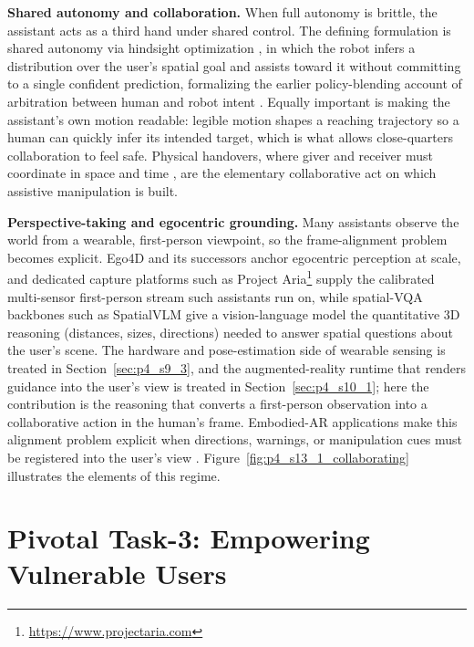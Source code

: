 \textbf{Shared autonomy and collaboration.} When full autonomy is brittle, the assistant acts as a third hand under shared control. 
The defining formulation is shared autonomy via hindsight optimization \cite{javdani2018shared}, in which the robot infers a distribution over the user's spatial goal and assists toward it without committing to a single confident prediction, formalizing the earlier policy-blending account of arbitration between human and robot intent \cite{dragan2013policy}. 
Equally important is making the assistant's own motion readable: legible motion \cite{dragan2013legibility} shapes a reaching trajectory so a human can quickly infer its intended target, which is what allows close-quarters collaboration to feel safe. Physical handovers, where giver and receiver must coordinate in space and time \cite{strabala2013handover}, are the elementary collaborative act on which assistive manipulation is built.

\textbf{Perspective-taking and egocentric grounding.} Many assistants observe the world from a wearable, first-person viewpoint, so the frame-alignment problem becomes explicit. 
Ego4D \cite{grauman2022ego4d} and its successors anchor egocentric perception at scale, and dedicated capture platforms such as Project Aria\footnote{\url{https://www.projectaria.com}} supply the calibrated multi-sensor first-person stream such assistants run on, while spatial-VQA backbones such as SpatialVLM \cite{chen2024spatialvlm} give a vision-language model the quantitative 3D reasoning (distances, sizes, directions) needed to answer spatial questions about the user's scene. 
The hardware and pose-estimation side of wearable sensing is treated in Section~\ref{sec:p4_s9_3}, and the augmented-reality runtime that renders guidance into the user's view is treated in Section~\ref{sec:p4_s10_1}; here the contribution is the reasoning that converts a first-person observation into a collaborative action in the human's frame. 
Embodied-AR applications make this alignment problem explicit when directions, warnings, or manipulation cues must be registered into the user's view \cite{yang2025embodiedar}. Figure~\ref{fig:p4_s13_1_collaborating} illustrates the elements of this regime.



\section{Pivotal Task-3: Empowering Vulnerable Users}
\label{subsec:p4-sec13-1-pivotal-task-3-empowering-vulnerable-users}

